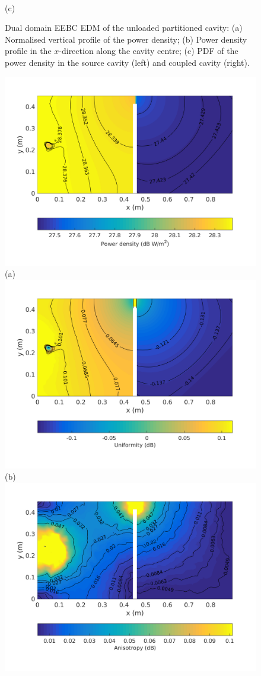 \documentclass[a4paper]{article}
\numberwithin{equation}{section}
\begin{document}
\begin{figure}[ht]
\begin{center}
\\
{\footnotesize (c)}\\
\vspace{-2mm}
\caption{\label{fg:partemptyddm_profs} Dual domain EEBC EDM of the unloaded partitioned cavity: (a) Normalised vertical profile of the power density; 
(b) Power density profile in the $x$-direction along the cavity centre; (c) PDF of the power density in the source cavity (left) and coupled cavity (right).}
\end{center}
\end{figure}

\begin{figure}[ht]
\begin{center}
\includegraphics[trim={0 8mm 0 12mm},clip,width=0.52\linewidth]{figures/DDM-EEBC_3D_DU_PowerDensityMap}\\
{\footnotesize (a)}\\
\vspace{2mm}
\includegraphics[trim={0 8mm 0 12mm},clip,width=0.52\linewidth]{figures/DDM-EEBC_3D_DU_EnergyDensityUniformityMap}\\
{\footnotesize (b)}\\
\vspace{2mm}
\includegraphics[trim={0 8mm 0 12mm},clip,width=0.52\linewidth]{figures/DDM-EEBC_3D_DU_EnergyDensityAnisotropyMap}\\

\end{center}
\end{figure}
\end{document}
